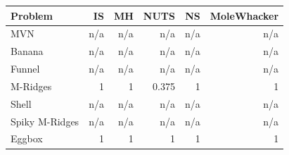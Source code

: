 \begin{tabular}{lrrrrr}
\toprule
Problem & IS & MH & NUTS & NS & MoleWhacker \\
\midrule
MVN & n/a & n/a & n/a & n/a & n/a \\
Banana & n/a & n/a & n/a & n/a & n/a \\
Funnel & n/a & n/a & n/a & n/a & n/a \\
M-Ridges & 1 & 1 & 0.375 & 1 & 1 \\
Shell & n/a & n/a & n/a & n/a & n/a \\
Spiky M-Ridges & n/a & n/a & n/a & n/a & n/a \\
\midrule
Eggbox & 1 & 1 & 1 & 1 & 1 \\
\bottomrule
\end{tabular}
